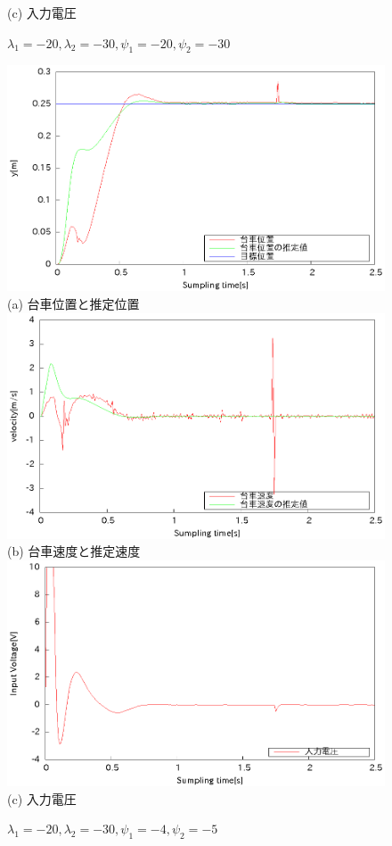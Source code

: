 \documentclass[11pt,a4paper]{jsarticle}
\begin{document}
\begin{figure}[H]
\begin{center}
   (c) 入力電圧
  \end{center}
  \caption{$\lambda_1 = -20,\lambda_2 = -30, \psi_1 = -20,\psi_2 = -30$}
 \end{figure}

 \newpage
 \begin{figure}[H]
  \begin{center}
   \includegraphics[scale = .8]{./picture/exp4.eps} \\
   (a) 台車位置と推定位置 \\
   \includegraphics[scale = .8]{./picture/exp4_2.eps} \\
   (b) 台車速度と推定速度 \\
   \includegraphics[scale = .8]{./picture/exp4_3.eps} \\
   (c) 入力電圧
  \end{center}
  \caption{$\lambda_1 = -20,\lambda_2 = -30, \psi_1 = -4,\psi_2 = -5$}
 \end{figure}
\end{document}
